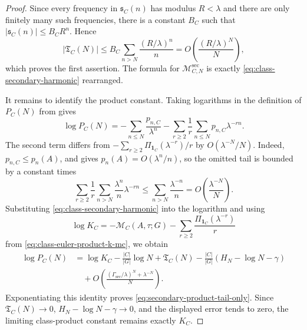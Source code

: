 \begin{proof}
  Since every frequency in \(\mathfrak s_C(n)\) has modulus \(R<\lambda\)
  and there are only finitely many such frequencies, there is a constant
  \(B_C\) such that \(|\mathfrak s_C(n)|\le B_C R^n\). Hence
  \[
    |\mathfrak T_C(N)|
    \le
    B_C\sum_{n>N}\frac{(R/\lambda)^n}{n}
    =O\!\left(\frac{(R/\lambda)^N}{N}\right),
  \]
  which proves the first assertion. The formula for
  \(\mathcal M_{C,N}^{\mathrm{sec}}\) is exactly
  \eqref{eq:class-secondary-harmonic} rearranged.

  It remains to identify the product constant. Taking logarithms in the
  definition of \(P_C(N)\) from 
  gives
  \[
    \log P_C(N)
    =
    -\sum_{n\le N}\frac{p_{n,C}}{\lambda^n}
    -\sum_{r\ge2}\frac1r\sum_{n\le N}p_{n,C}\lambda^{-rn}.
  \]
  The second term differs from
  \(-\sum_{r\ge2}\Pi_{\mathbf 1_C}(\lambda^{-r})/r\) by
  \(O(\lambda^{-N}/N)\). Indeed, \(p_{n,C}\le p_n(A)\), and
   gives
  \(p_n(A)=O(\lambda^n/n)\), so the omitted tail is bounded by a constant
  times
  \[
    \sum_{r\ge2}\frac1r\sum_{n>N}\frac{\lambda^n}{n}\lambda^{-rn}
    \le
    \sum_{n>N}\frac{\lambda^{-n}}{n}
    =O\!\left(\frac{\lambda^{-N}}{N}\right).
  \]
  Substituting \eqref{eq:class-secondary-harmonic} into the logarithm and
  using
  \[
    \log K_C
    =
    -\mathcal M_C(A,\tau;G)
    -\sum_{r\ge2}\frac{\Pi_{\mathbf 1_C}(\lambda^{-r})}{r}
  \]
  from \eqref{eq:class-euler-product-k-mc}, we obtain
  \[
  \begin{aligned}
    \log P_C(N)
    &=
    \log K_C
    -\frac{|C|}{|G|}\log N
    +\mathfrak T_C(N)
    -\frac{|C|}{|G|}(H_N-\log N-\gamma)\\
    &\quad
    +O\!\left(\frac{(\Gamma_{\mathrm{sec}}/\lambda)^N+\lambda^{-N}}{N}\right).
  \end{aligned}
  \]
  Exponentiating this identity proves
  \eqref{eq:secondary-product-tail-only}. Since
  \(\mathfrak T_C(N)\to0\), \(H_N-\log N-\gamma\to0\), and the displayed
  error tends to zero, the limiting class-product constant remains
  exactly \(K_C\).
\end{proof}

